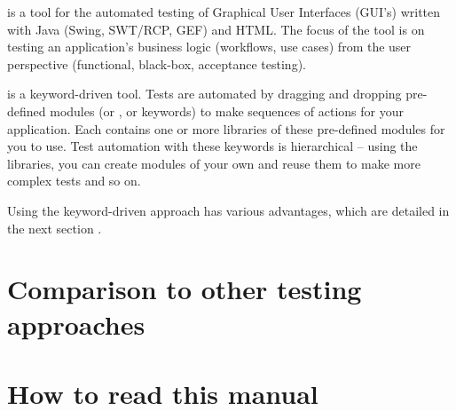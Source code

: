 
\app{} is a tool for the automated testing of Graphical User Interfaces (GUI's) written with Java (Swing, SWT/RCP, GEF) and HTML. The focus of the tool is on testing an application's business logic (workflows, use cases)  from the user perspective (functional, black-box, acceptance testing).
 
\app{} is a keyword-driven tool. Tests are automated by dragging and dropping pre-defined modules (or \gdcases{}, or keywords) to make sequences of actions for your application. Each \app{} \gdproject{}  contains one or more libraries of these pre-defined modules for you to use. Test automation with these keywords is hierarchical -- using the libraries, you can create modules of your own and reuse them to make more complex tests and so on. 

Using the keyword-driven approach has various advantages, which are detailed in the next section . 

\section{Comparison to other testing approaches}

\clearpage

\section{How to read this manual}

\clearpage





